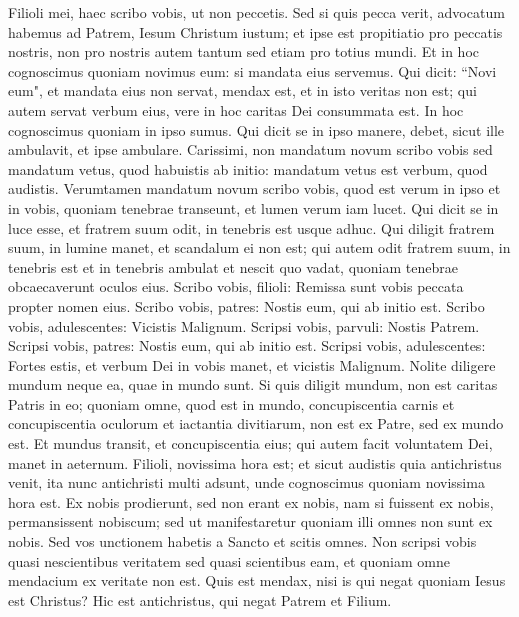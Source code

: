 \begin{biblechapter} 
\verse Filioli mei, haec scribo vobis, ut non peccetis. Sed si quis pecca verit, advocatum habemus ad Patrem, Iesum Christum iustum; 
\verse et ipse est propitiatio pro peccatis nostris, non pro nostris autem tantum sed etiam pro totius mundi. 
\verse Et in hoc cognoscimus quoniam novimus eum: si mandata eius servemus. 
\verse Qui dicit: “Novi eum", et mandata eius non servat, mendax est, et in isto veritas non est; 
\verse qui autem servat verbum eius, vere in hoc caritas Dei consummata est. In hoc cognoscimus quoniam in ipso sumus. 
\verse Qui dicit se in ipso manere, debet, sicut ille ambulavit, et ipse ambulare. 
\verse Carissimi, non mandatum novum scribo vobis sed mandatum vetus, quod habuistis ab initio: mandatum vetus est verbum, quod audistis. 
\verse Verumtamen mandatum novum scribo vobis, quod est verum in ipso et in vobis, quoniam tenebrae transeunt, et lumen verum iam lucet. 
\verse Qui dicit se in luce esse, et fratrem suum odit, in tenebris est usque adhuc. 
\verse Qui diligit fratrem suum, in lumine manet, et scandalum ei non est; 
\verse qui autem odit fratrem suum, in tenebris est et in tenebris ambulat et nescit quo vadat, quoniam tenebrae obcaecaverunt oculos eius. 
\verse Scribo vobis, filioli: Remissa sunt vobis peccata propter nomen eius. 
\verse Scribo vobis, patres: Nostis eum, qui ab initio est. Scribo vobis, adulescentes: Vicistis Malignum. 
\verse Scripsi vobis, parvuli: Nostis Patrem. Scripsi vobis, patres: Nostis eum, qui ab initio est. Scripsi vobis, adulescentes: Fortes estis, et verbum Dei in vobis manet, et vicistis Malignum. 
\verse Nolite diligere mundum neque ea, quae in mundo sunt. Si quis diligit mundum, non est caritas Patris in eo; 
\verse quoniam omne, quod est in mundo, concupiscentia carnis et concupiscentia oculorum et iactantia divitiarum, non est ex Patre, sed ex mundo est. 
\verse Et mundus transit, et concupiscentia eius; qui autem facit voluntatem Dei, manet in aeternum. 
\verse Filioli, novissima hora est; et sicut audistis quia antichristus venit, ita nunc antichristi multi adsunt, unde cognoscimus quoniam novissima hora est.  
\verse Ex nobis prodierunt, sed non erant ex nobis, nam si fuissent ex nobis, permansissent nobiscum; sed ut manifestaretur quoniam illi omnes non sunt ex nobis. 
\verse Sed vos unctionem habetis a Sancto et scitis omnes. 
\verse Non scripsi vobis quasi nescientibus veritatem sed quasi scientibus eam, et quoniam omne mendacium ex veritate non est. 
\verse Quis est mendax, nisi is qui negat quoniam Iesus est Christus? Hic est antichristus, qui negat Patrem et Filium.  

\end{biblechapter}

